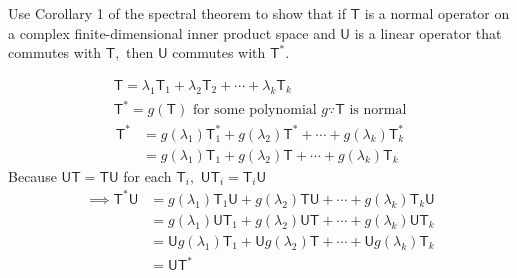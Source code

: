 Use Corollary 1 of the spectral theorem to show that if $\mathsf{T}$
is a normal operator on a complex finite-dimensional inner product
space and $\mathsf{U}$ is a linear operator that commutes with
$\mathsf{T},$ then $\mathsf{U}$ commutes with $\mathsf{T}^*.$

\begin{gather}
\mathsf{T} = \lambda_1\mathsf{T}_1 + \lambda_2\mathsf{T}_2 + \dotsb +
\lambda_k\mathsf{T}_k\\ 
\mathsf{T}^* = g(\mathsf{T}) \text{ for some polynomial } g \because
\mathsf{T} \text{ is normal}
\end{gather}
\begin{align}
\mathsf{T}^* &= g(\lambda_1)\mathsf{T}_1^* + g(\lambda_2)\mathsf{T}^* +
\dotsb + g(\lambda_k)\mathsf{T}_k^*\\
&= g(\lambda_1)\mathsf{T}_1 + g(\lambda_2)\mathsf{T} +
\dotsb + g(\lambda_k)\mathsf{T}_k
\end{align}
Because $\mathsf{U}\mathsf{T}=\mathsf{T}\mathsf{U}$ for each
$\mathsf{T}_i,$ $\mathsf{U}\mathsf{T}_i=\mathsf{T}_i\mathsf{U}$ 
\begin{align}
\implies \mathsf{T}^*\mathsf{U} &= g(\lambda_1)\mathsf{T}_1\mathsf{U}
+ g(\lambda_2)\mathsf{T}\mathsf{U} +
\dotsb + g(\lambda_k)\mathsf{T}_k\mathsf{U}\\
&= g(\lambda_1)\mathsf{U}\mathsf{T}_1
+ g(\lambda_2)\mathsf{U}\mathsf{T} +
\dotsb + g(\lambda_k)\mathsf{U}\mathsf{T}_k\\
&=\mathsf{U}g(\lambda_1)\mathsf{T}_1 + \mathsf{U}g(\lambda_2)\mathsf{T} +
\dotsb +\mathsf{U}g(\lambda_k)\mathsf{T}_k\\
&= \mathsf{U}\mathsf{T}^*
\end{align}
